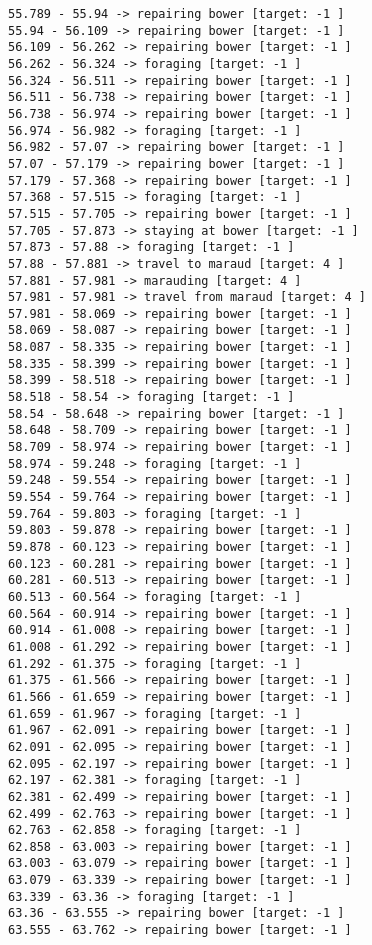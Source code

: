 \documentclass[11pt]{article}
\begin{document}
\begin{Verbatim}[commandchars=\\\{\}]
55.789 - 55.94 -> repairing bower [target: -1 ]
55.94 - 56.109 -> repairing bower [target: -1 ]
56.109 - 56.262 -> repairing bower [target: -1 ]
56.262 - 56.324 -> foraging [target: -1 ]
56.324 - 56.511 -> repairing bower [target: -1 ]
56.511 - 56.738 -> repairing bower [target: -1 ]
56.738 - 56.974 -> repairing bower [target: -1 ]
56.974 - 56.982 -> foraging [target: -1 ]
56.982 - 57.07 -> repairing bower [target: -1 ]
57.07 - 57.179 -> repairing bower [target: -1 ]
57.179 - 57.368 -> repairing bower [target: -1 ]
57.368 - 57.515 -> foraging [target: -1 ]
57.515 - 57.705 -> repairing bower [target: -1 ]
57.705 - 57.873 -> staying at bower [target: -1 ]
57.873 - 57.88 -> foraging [target: -1 ]
57.88 - 57.881 -> travel to maraud [target: 4 ]
57.881 - 57.981 -> marauding [target: 4 ]
57.981 - 57.981 -> travel from maraud [target: 4 ]
57.981 - 58.069 -> repairing bower [target: -1 ]
58.069 - 58.087 -> repairing bower [target: -1 ]
58.087 - 58.335 -> repairing bower [target: -1 ]
58.335 - 58.399 -> repairing bower [target: -1 ]
58.399 - 58.518 -> repairing bower [target: -1 ]
58.518 - 58.54 -> foraging [target: -1 ]
58.54 - 58.648 -> repairing bower [target: -1 ]
58.648 - 58.709 -> repairing bower [target: -1 ]
58.709 - 58.974 -> repairing bower [target: -1 ]
58.974 - 59.248 -> foraging [target: -1 ]
59.248 - 59.554 -> repairing bower [target: -1 ]
59.554 - 59.764 -> repairing bower [target: -1 ]
59.764 - 59.803 -> foraging [target: -1 ]
59.803 - 59.878 -> repairing bower [target: -1 ]
59.878 - 60.123 -> repairing bower [target: -1 ]
60.123 - 60.281 -> repairing bower [target: -1 ]
60.281 - 60.513 -> repairing bower [target: -1 ]
60.513 - 60.564 -> foraging [target: -1 ]
60.564 - 60.914 -> repairing bower [target: -1 ]
60.914 - 61.008 -> repairing bower [target: -1 ]
61.008 - 61.292 -> repairing bower [target: -1 ]
61.292 - 61.375 -> foraging [target: -1 ]
61.375 - 61.566 -> repairing bower [target: -1 ]
61.566 - 61.659 -> repairing bower [target: -1 ]
61.659 - 61.967 -> foraging [target: -1 ]
61.967 - 62.091 -> repairing bower [target: -1 ]
62.091 - 62.095 -> repairing bower [target: -1 ]
62.095 - 62.197 -> repairing bower [target: -1 ]
62.197 - 62.381 -> foraging [target: -1 ]
62.381 - 62.499 -> repairing bower [target: -1 ]
62.499 - 62.763 -> repairing bower [target: -1 ]
62.763 - 62.858 -> foraging [target: -1 ]
62.858 - 63.003 -> repairing bower [target: -1 ]
63.003 - 63.079 -> repairing bower [target: -1 ]
63.079 - 63.339 -> repairing bower [target: -1 ]
63.339 - 63.36 -> foraging [target: -1 ]
63.36 - 63.555 -> repairing bower [target: -1 ]
63.555 - 63.762 -> repairing bower [target: -1 ]

\end{Verbatim}
\end{document}
